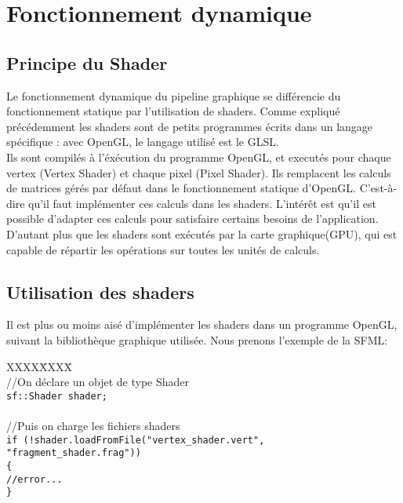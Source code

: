 \section{Fonctionnement dynamique}

\subsection{Principe du Shader}

Le fonctionnement dynamique du pipeline graphique se différencie du fonctionnement statique par l'utilisation de shaders.
Comme expliqué précédemment les shaders sont de petits programmes écrits dans un langage spécifique : avec OpenGL, le langage utilisé est le GLSL.\\
Ils sont compilés à l'éxécution du programme OpenGL, et executés pour chaque vertex (Vertex Shader) et chaque pixel (Pixel Shader).
Ils remplacent les calculs de matrices gérés par défaut dans le fonctionnement statique d'OpenGL. C'est-à-dire qu'il faut implémenter ces calculs dans les shaders. L'intérêt est qu'il est possible d'adapter ces calculs pour satisfaire certains besoins de l'application. D'autant plus que les shaders sont exécutés par la carte graphique(GPU), qui est capable de répartir les opérations sur toutes les unités de calculs.

\subsection{Utilisation des shaders}

Il est plus ou moins aisé d'implémenter les shaders dans un programme OpenGL, suivant la bibliothèque graphique utilisée.
Nous prenons l'exemple de la SFML:\\

\begin{tabbing}
XXXX\=XXXX\= \kill\\
\> //On déclare un objet de type Shader\\
\> \verb|sf::Shader shader;|\\
\\
\>//Puis on charge les fichiers shaders\\
\> \verb|if (!shader.loadFromFile("vertex_shader.vert", "fragment_shader.frag"))|\\
\> \verb|{|\\
\> \>\verb|//error...|\\
\> \verb|}|\\
\end{tabbing}

